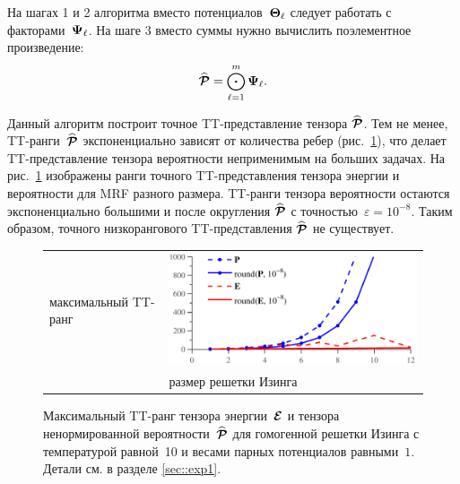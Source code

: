 На шагах 1 и 2 алгоритма вместо потенциалов~$\boldsymbol{\Theta}_\ell$ следует работать с факторами~$\boldsymbol{\Psi}_{\ell}$. На шаге 3 вместо суммы нужно вычислить поэлементное произведение:
\begin{equation}
\widehat{\boldsymbol{\mathcal{P}}} =   \bigodot_{\ell = 1}^{m} \boldsymbol{\Psi}_{\ell}.
\end{equation}

Данный алгоритм построит точное TT\hyp{}представление тензора $\widehat{\boldsymbol{\mathcal{P}}}$. Тем не менее, TT\hyp{}ранги~$\widehat{\boldsymbol{\mathcal{P}}}$ экспоненциально зависят от количества ребер (рис.~\ref{fig:ranks-growth}), что делает TT\hyp{}представление тензора вероятности неприменимым на больших задачах. На рис.~\ref{fig:ranks-growth} изображены ранги точного TT-представления тензора энергии и вероятности для MRF разного размера. TT\hyp{}ранги тензора вероятности остаются экспоненциально большими и после округления $\widehat{\boldsymbol{\mathcal{P}}}$ с точностью~$\varepsilon = 10^{-8}$. Таким образом, точного низкорангового TT\hyp{}представления $\widehat{\boldsymbol{\mathcal{P}}}$ не существует.

 \begin{figure}[t]
 \begin{center}
 \begin{tabular}{m{0.3cm}@{}m{12cm}}
 \begin{sideways}\parbox{3.5cm}{\centering\scriptsize максимальный TT\hyp{}ранг }\end{sideways}
 & \includegraphics[width=12.0cm]{images/ranks_growth_temp=10,N=12,J=1_v2.pdf}
 \\
 & \parbox{12.3cm}{\centering\scriptsize размер решетки Изинга } \\
 \end{tabular}
 \caption{Максимальный TT\hyp{}ранг тензора энергии~$\boldsymbol{\mathcal{E}}$ и тензора ненормированной вероятности~$\widehat{\boldsymbol{\mathcal{P}}}$ для гомогенной решетки Изинга с температурой равной~10 и весами парных потенциалов равными~$1$. Детали см. в разделе \ref{sec::exp1}. \label{fig:ranks-growth}}
 \end{center}
 \end{figure}


